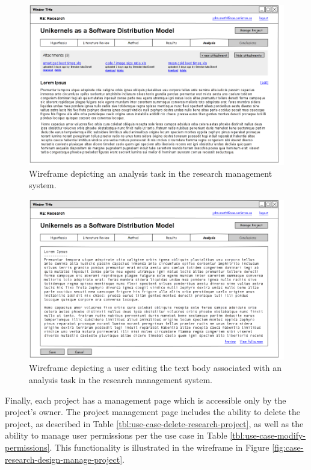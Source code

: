 \documentclass[document.tex]{subfiles}
\begin{document}
\begin{figure}[!ht]
\centering \includegraphics[width=5.5in]{./img/case-study-research-railgun/mockup-view-analysis}
\caption{Wireframe depicting an analysis task in the research management system.}
\label{fig:case-research-design-view-analysis}
\end{figure}

\begin{figure}[!ht]
\centering \includegraphics[width=5.5in]{./img/case-study-research-railgun/mockup-edit-analysis}
\caption{Wireframe depicting a user editing the text body associated with an analysis task in the research management system.}
\label{fig:case-research-design-edit-analysis}
\end{figure}

Finally, each project has a management page which is accessible only by the project's owner.
The project management page includes the ability to delete the project, as described in Table \ref{tbl:use-case-delete-research-project}, as well as the ability to manage user permissions per the use case in Table \ref{tbl:use-case-modify-permissions}.
This functionality is illustrated in the wireframe in Figure \ref{fig:case-research-design-manage-project}.
\end{document}
